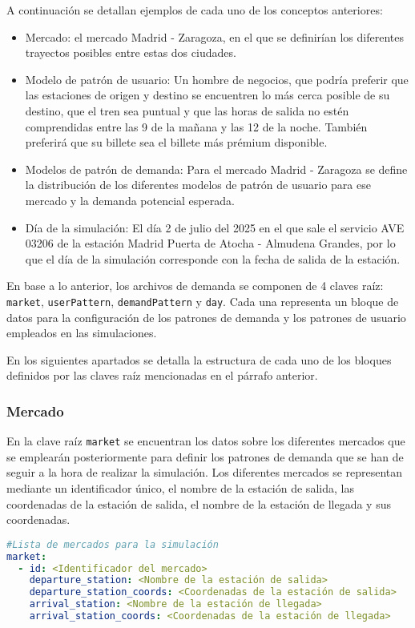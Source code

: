 A continuación se detallan ejemplos de cada uno de los conceptos anteriores:
    \begin{itemize}
        \item Mercado: el mercado Madrid - Zaragoza, en el que se definirían los diferentes trayectos posibles entre estas dos ciudades.
        \item Modelo de patrón de usuario: Un hombre de negocios, que podría preferir que las estaciones de origen y destino se encuentren lo más cerca posible de su destino, que el tren sea puntual y que las horas de salida no estén comprendidas entre las 9 de la mañana y las 12 de la noche. También preferirá que su billete sea el billete más prémium disponible. 
        \item Modelos de patrón de demanda: Para el mercado Madrid - Zaragoza se define la distribución de los diferentes modelos de patrón de usuario para ese mercado y la demanda potencial esperada.
        \item Día de la simulación: El día 2 de julio del 2025 en el que sale el servicio AVE 03206 de la estación Madrid Puerta de Atocha - Almudena Grandes, por lo que el día de la simulación corresponde con la fecha de salida de la estación. 
    \end{itemize}


En base a lo anterior, los archivos de demanda se componen de 4 claves raíz: \texttt{market}, \texttt{userPattern}, \texttt{demandPattern} y \texttt{day}. Cada una representa un bloque de datos para la configuración de los patrones de demanda y los patrones de usuario empleados en las simulaciones.

En los siguientes apartados se detalla la estructura de cada uno de los bloques definidos por las claves raíz mencionadas en el párrafo anterior.

\subsubsection{Mercado}

En la clave raíz \texttt{market} se encuentran los datos sobre los diferentes mercados que se emplearán posteriormente para definir los patrones de demanda que se han de seguir a la hora de realizar la simulación. Los diferentes mercados se representan mediante un identificador único, el nombre de la estación de salida, las coordenadas de la estación de salida, el nombre de la estación de llegada y sus coordenadas.

\begin{lstlisting}[language=YAML,
                   frame=none,
                   numbers=none,
                   basicstyle=\ttfamily\normalsize,
                   caption={Estructura de la clave raíz \texttt{market}},
                   label=src:estructuraMarket,
                   inputencoding=utf8]
#Lista de mercados para la simulación
market:
  - id: <Identificador del mercado>
    departure_station: <Nombre de la estación de salida>
    departure_station_coords: <Coordenadas de la estación de salida>
    arrival_station: <Nombre de la estación de llegada>
    arrival_station_coords: <Coordenadas de la estación de llegada>
\end{lstlisting}


